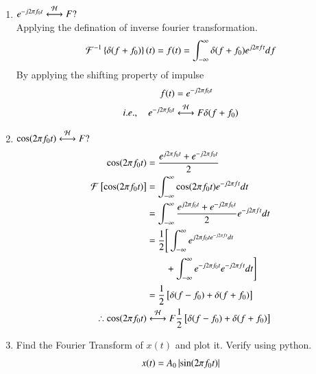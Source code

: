 \documentclass[journal,12pt,twocolumn]{IEEEtran}
\renewcommand\thesection{\arabic{section}}
\begin{document}
\begin{enumerate}[label=\thesection.\arabic*
	,ref=\thesection.\theenumi]
\begin{align}
		\mathcal{F}\cbrak{\delta(t-t_0)}(f) = \mathcal{F}(t)= \int_{-\infty}^{\infty} \delta(t-t_0)e^{-j2\pi ft}dt.
	 \end{align}
	 By applying the time shifting property of impulse we get
	 \begin{align}
		\mathcal{F}(f) &= e^{-j2\pi ft_0}\\
		i.e., \quad \delta(t-t_0) &\system{F} e^{-j2\pi ft_0}
	 \end{align}
	 Now, substitute $t_0 = 0$ we get 
	 \begin{align}
		\delta(t) \system{F} 1
	 \end{align}
	 \item $e^{-j2\pi f_0t}\overset{\mathcal{H}}{ \longleftrightarrow}{F}?$\\
	 \solution Applying the defination of inverse fourier transformation.
	 \begin{align}
		\mathcal{F}^{-1}\left\{\delta(f+f_0)\right\}(t) = f(t)= \int_{-\infty}^{\infty}\delta(f+f_0)e^{j2\pi ft}df
	 \end{align}
	 By applying the shifting property of impulse 
	 \begin{align}
		f(t) &= e^{-j2\pi f_0t}\\
		i.e., \quad e^{-j2\pi f_0t} &\overset{\mathcal{H}}{ \longleftrightarrow}{F} \delta(f+f_0)
	 \end{align}
	 \item $\cos(2\pi f_0t)\overset{\mathcal{H}}{ \longleftrightarrow}{F}?$\\
	 \solution \begin{align}
		\cos(2\pi f_0t) &= \frac{e^{j2\pi f_0t}+e^{-j2\pi f_0t}}{2}\\
		\mathcal{F}{}\left[\cos(2\pi f_0t)\right] &= \int_{-\infty}^\infty \cos(2\pi f_0t) e^{-j2\pi ft}dt\\
		&= \int_{-\infty}^\infty \frac{e^{j2\pi f_0t}+e^{-j2\pi f_0t}}{2} e^{-j2\pi ft}dt\\
		&= \frac{1}{2}\Bigg[\int_{-\infty}^\infty e^{j2\pi f_0te^{-j2\pi ft}dt}\nonumber \\&\qquad+ \int_{-\infty}^\infty e^{-j2\pi f_0t}e^{-j2\pi ft}dt\Bigg]\\
		&= \frac{1}{2}{}\left[\delta(f-f_0)+\delta(f+f_0)\right]\\
		\therefore \cos(2\pi f_0t)&\overset{\mathcal{H}}{ \longleftrightarrow}{F}\frac{1}{2}{}\left[\delta(f-f_0)+\delta(f+f_0)\right]
	 \end{align}
	 \item Find the Fourier Transform of $x(t)$ and plot it.  Verify using python.\\
	 \solution \begin{align}
		x(t) &= A_0 \abs{\sin(2\pi f_0 t)}\\

\end{align}
\end{enumerate}
\end{document}
